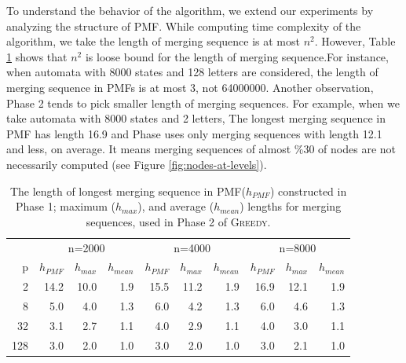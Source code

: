 \documentclass[12pt]{article}
\newcommand{\comment}[2]{{\color{red}{\bf (#1: #2)}}}
\newcommand{\greedyAlgo}{\textsc{Greedy}}
\begin{document}
To understand the behavior of the algorithm, we extend our experiments by analyzing the structure of PMF. While computing time complexity of the algorithm, we take the length of merging sequence is at most $n^2$. However, Table \ref{table:levels} shows that $n^2$ is loose bound for the length of merging sequence.For instance, when automata with 8000 states and 128 letters are considered, the length of merging sequence in PMFs is at most 3, not 64000000. Another observation, Phase 2 tends to pick smaller length of merging sequences. For example, when we take automata with 8000 states and 2 letters, The longest merging sequence in PMF has length 16.9 and Phase uses only merging sequences with length 12.1 and less, on average. It means merging sequences of almost \%30 of nodes are not necessarily computed (see Figure \ref{fig:nodes-at-levels}).

\begin{table}[ht]
\center
\begin{tabular}{r|rrr|rrr|rrr}
 & \multicolumn{3}{c|}{n=2000} & \multicolumn{3}{c|}{n=4000} & \multicolumn{3}{c}{n=8000} \\
p &  $h_{PMF}$ &  $h_{max}$ &  $h_{mean}$ &  $h_{PMF}$ &  $h_{max}$ &  $h_{mean}$ &  $h_{PMF}$ &  $h_{max}$ &  $h_{mean}$ \\ \hline
 2 &  14.2 &  10.0 &  1.9 &  15.5 &  11.2 &  1.9 &  16.9 &  12.1 &  1.9 \\
 8 &  5.0 &  4.0 &  1.3 &  6.0 &  4.2 &  1.3 &  6.0 &  4.6 &  1.3 \\
 32 &  3.1 &  2.7 &  1.1 &  4.0 &  2.9 &  1.1 &  4.0 &  3.0 &  1.1 \\
 128 &  3.0 &  2.0 &  1.0 &  3.0 &  2.0 &  1.0 &  3.0 &  2.1 &  1.0
\end{tabular}
\caption{The length of longest merging sequence in PMF($h_{PMF}$) constructed in Phase 1; maximum ($h_{max}$), and average ($h_{mean}$) lengths for merging sequences, used in Phase 2 of \greedyAlgo. \comment{sertac}{cerny deneyleri}}
\label{table:levels}
\end{table}
\end{document}

